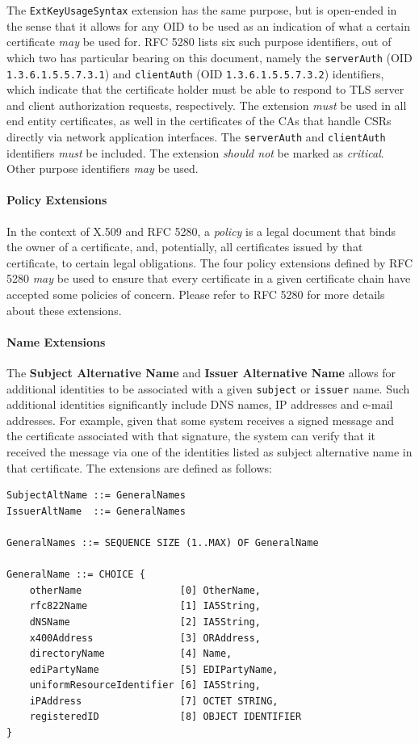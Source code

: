 The \texttt{ExtKeyUsageSyntax} extension has the same purpose, but is open-ended in the sense that it allows for any OID to be used as an indication of what a certain certificate \textit{may} be used for.
RFC 5280 lists six such purpose identifiers, out of which two has particular bearing on this document, namely the \texttt{serverAuth} (OID \texttt{1.3.6.1.5.5.7.3.1}) and \texttt{clientAuth} (OID \texttt{1.3.6.1.5.5.7.3.2}) identifiers, which indicate that the certificate holder must be able to respond to TLS server and client authorization requests, respectively.
The extension \textit{must} be used in all end entity certificates, as well in the certificates of the CAs that handle CSRs directly via network application interfaces.
The \texttt{serverAuth} and \texttt{clientAuth} identifiers \textit{must} be included.
The extension \textit{should not} be marked as \textit{critical}.
Other purpose identifiers \textit{may} be used.

\paragraph{Policy Extensions}

In the context of X.509 and RFC 5280, a \textit{policy} is a legal document that binds the owner of a certificate, and, potentially, all certificates issued by that certificate, to certain legal obligations.
The four policy extensions defined by RFC 5280 \textit{may} be used to ensure that every certificate in a given certificate chain have accepted some policies of concern.
Please refer to RFC 5280 for more details about these extensions.

\paragraph{Name Extensions}

The \textbf{Subject Alternative Name} and \textbf{Issuer Alternative Name} allows for additional identities to be associated with a given \texttt{subject} or \texttt{issuer} name.
Such additional identities significantly include DNS names, IP addresses and e-mail addresses.
For example, given that some system receives a signed message and the certificate associated with that signature, the system can verify that it received the message via one of the identities listed as subject alternative name in that certificate.
The extensions are defined as follows:

\begin{verbatim}
SubjectAltName ::= GeneralNames
IssuerAltName  ::= GeneralNames

GeneralNames ::= SEQUENCE SIZE (1..MAX) OF GeneralName

GeneralName ::= CHOICE {
    otherName                 [0] OtherName,
    rfc822Name                [1] IA5String,
    dNSName                   [2] IA5String,
    x400Address               [3] ORAddress,
    directoryName             [4] Name,
    ediPartyName              [5] EDIPartyName,
    uniformResourceIdentifier [6] IA5String,
    iPAddress                 [7] OCTET STRING,
    registeredID              [8] OBJECT IDENTIFIER
}
\end{verbatim}

